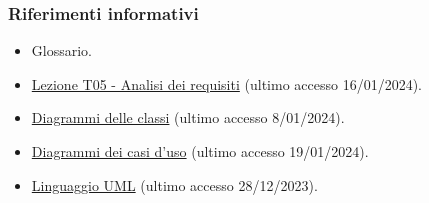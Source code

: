 \subsubsection{Riferimenti informativi}
\begin{itemize}
    \item Glossario.
    \item \href{https://www.math.unipd.it/~tullio/IS-1/2023/Dispense/T5.pdf}{Lezione T05 - Analisi dei requisiti} (ultimo accesso 16/01/2024).
    \item \href{https://www.math.unipd.it/~rcardin/swea/2023/Diagrammi%20delle%20Classi.pdf}{Diagrammi delle classi} (ultimo accesso 8/01/2024).
    \item \href{https://www.math.unipd.it/~rcardin/swea/2022/Diagrammi%20Use%20Case.pdf}{Diagrammi dei casi d'uso} (ultimo accesso 19/01/2024).
    \item \href{https://bsituos.weebly.com/uploads/2/5/2/5/25253721/applying-uml-and-patterns-3rd.pdf}{Linguaggio UML} (ultimo accesso 28/12/2023).
\end{itemize}

